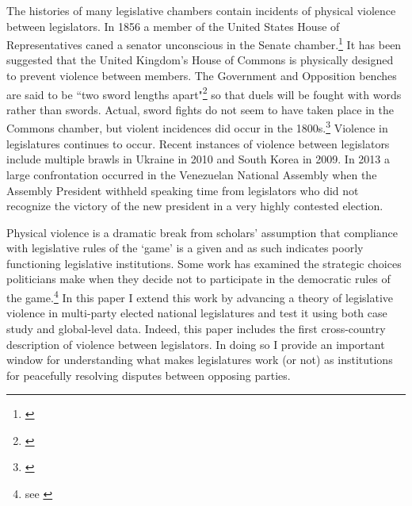 \documentclass[a4paper]{article}\usepackage[]{graphicx}\usepackage[]{color}
\begin{document}
The histories of many legislative chambers contain incidents of physical violence between legislators. In 1856 a member of the United States House of Representatives caned a senator unconscious in the Senate chamber.\footnote{\citealt{USSenateCanning}} It has been suggested that the United Kingdom's House of Commons is physically designed to prevent violence between members. The Government and Opposition benches are said to be ``two sword lengths apart"\footnote{\citealt{ParliamentUKSword}} so that duels will be fought with words rather than swords. Actual, sword fights do not seem to have taken place in the Commons chamber, but violent incidences did occur in the 1800s.\footnote{\citealt{ByrneViolence}} Violence in legislatures continues to occur. Recent instances of violence between legislators include multiple brawls in Ukraine in 2010 and South Korea in 2009. In 2013 a large confrontation occurred in the Venezuelan National Assembly when the Assembly President withheld speaking time from legislators who did not recognize the victory of the new president in a very highly contested election.

Physical violence is a dramatic break from scholars' assumption that compliance with legislative rules of the `game' is a given and as such indicates poorly functioning legislative institutions. Some work has examined the strategic choices politicians make when they decide not to participate in the democratic rules of the game.\footnote{see \citealt{Beaulieu2008,BeaulieuForthcoming,wilkinson2006}} In this paper I extend this work by advancing a theory of legislative violence in multi-party elected national legislatures and test it using both case study and global-level data. Indeed, this paper includes the first cross-country description of violence between legislators. In doing so I provide an important window for understanding what makes legislatures work (or not) as institutions for peacefully resolving disputes between opposing parties.
\end{document}
